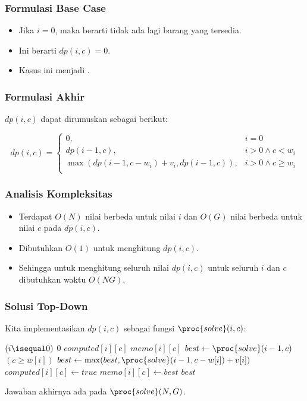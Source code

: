 \begin{frame} 
\frametitle{Formulasi Base Case}
\begin{itemize}
  \item Jika $i=0$, maka berarti tidak ada lagi barang yang tersedia. 
  \item Ini berarti $dp(i,c) = 0$.
  \item Kasus ini menjadi \fbasecase.
\end{itemize}
\end{frame}

\begin{frame} 
\frametitle{Formulasi Akhir}
$dp(i,c)$ dapat dirumuskan sebagai berikut:
\begin{small}
\[dp(i,c) = \left\{\begin{array}{lr}
    0, & i = 0\\
    dp(i-1,c), & i > 0 \wedge c < w_i\\
    \max(dp(i-1,c-w_i)+v_i,dp(i-1,c)), & i > 0 \wedge c \geq w_i\\
    \end{array}\right.\]
\end{small}
\end{frame}

\begin{frame} 
\frametitle{Analisis Kompleksitas}
\begin{itemize}
  \item Terdapat $O(N)$ nilai berbeda untuk nilai $i$ dan $O(G)$ nilai berbeda untuk nilai $c$ pada $dp(i,c)$.
  \item Dibutuhkan $O(1)$ untuk menghitung $dp(i,c)$. 
  \item Sehingga untuk menghitung seluruh nilai $dp(i,c)$ untuk seluruh $i$ dan $c$ dibutuhkan waktu $O(NG)$.
\end{itemize}
\end{frame}

\begin{frame}
\frametitle{Solusi Top-Down}
Kita implementasikan $dp(i, c)$ sebagai fungsi $\proc{solve}(i,c)$:
\begin{codebox}
\li \If $(i \isequal 0)$ \Then
\li   \Return $0$
    \End
\li \If $computed[i][c]$ \Then
\li   \Return $memo[i][c]$ 
    \End
\li $best \gets \proc{solve}(i-1, c)$
\li \If $(c \geq w[i])$ \Then
\li   $best \gets \max(best, \proc{solve}(i - 1, c-w[i]) + v[i])$
    \End  
\li $computed[i][c] \gets true$
\li $memo[i][c] \gets best$
\li \Return $best$
    \End
\end{codebox}

Jawaban akhirnya ada pada $\proc{solve}(N, G)$.
\end{frame}

